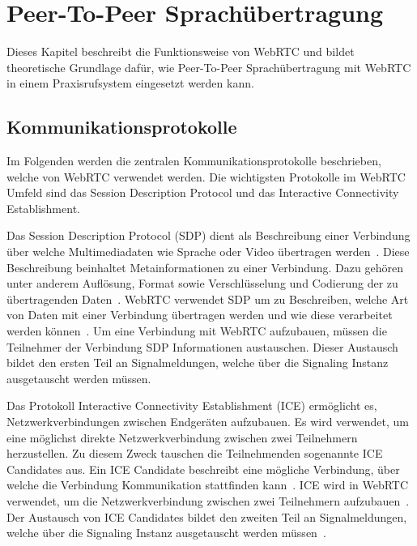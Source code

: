 \section{Peer-To-Peer Sprachübertragung}

Dieses Kapitel beschreibt die Funktionsweise von WebRTC und bildet theoretische Grundlage dafür, wie Peer-To-Peer Sprachübertragung mit WebRTC in einem Praxisrufsystem eingesetzt werden kann.

\subsection{Kommunikationsprotokolle}

Im Folgenden werden die zentralen Kommunikationsprotokolle beschrieben, welche von WebRTC verwendet werden.
Die wichtigsten Protokolle im WebRTC Umfeld sind das Session Description Protocol und das Interactive Connectivity Establishment.

Das Session Description Protocol (SDP) dient als Beschreibung einer Verbindung über welche Multimediadaten wie Sprache oder Video übertragen werden~\cite{rfc_4566_sdp}.
Diese Beschreibung beinhaltet Metainformationen zu einer Verbindung.
Dazu gehören unter anderem Auflösung, Format sowie Verschlüsselung und Codierung der zu übertragenden Daten~\cite{mozilla_webRTC_protocols}.
WebRTC verwendet SDP um zu Beschreiben, welche Art von Daten mit einer Verbindung übertragen werden und wie diese verarbeitet werden können~\cite{webrtc_spec}.
Um eine Verbindung mit WebRTC aufzubauen, müssen die Teilnehmer der Verbindung SDP Informationen austauschen.
Dieser Austausch bildet den ersten Teil an Signalmeldungen, welche über die Signaling Instanz ausgetauscht werden müssen.

Das Protokoll Interactive Connectivity Establishment (ICE) ermöglicht es, Netzwerkverbindungen zwischen Endgeräten aufzubauen.
Es wird verwendet, um eine möglichst direkte Netzwerkverbindung zwischen zwei Teilnehmern herzustellen.
Zu diesem Zweck tauschen die Teilnehmenden sogenannte ICE Candidates aus.
Ein ICE Candidate beschreibt eine mögliche Verbindung, über welche die Verbindung Kommunikation stattfinden kann~\cite{rfc_8445_ice}.
ICE wird in WebRTC verwendet, um die Netzwerkverbindung zwischen zwei Teilnehmern aufzubauen~\cite{mozilla_webRTC_protocols}.
Der Austausch von ICE Candidates bildet den zweiten Teil an Signalmeldungen, welche über die Signaling Instanz ausgetauscht werden müssen~\cite{webrtc_spec}.


